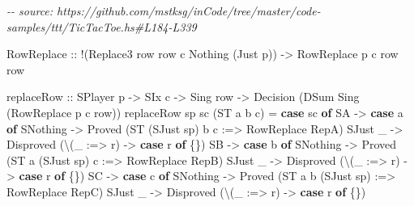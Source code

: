 \documentclass[]{article}
\newenvironment{Shaded}{}{}
\newcommand{\CommentTok}[1]{\textcolor[rgb]{0.38,0.63,0.69}{\textit{#1}}}
\newcommand{\DataTypeTok}[1]{\textcolor[rgb]{0.56,0.13,0.00}{#1}}
\newcommand{\KeywordTok}[1]{\textcolor[rgb]{0.00,0.44,0.13}{\textbf{#1}}}
\newcommand{\NormalTok}[1]{#1}
\newcommand{\OperatorTok}[1]{\textcolor[rgb]{0.40,0.40,0.40}{#1}}
\newcommand{\OtherTok}[1]{\textcolor[rgb]{0.00,0.44,0.13}{#1}}
\begin{document}
\begin{Shaded}
\begin{Highlighting}[]
\CommentTok{{-}{-} source: https://github.com/mstksg/inCode/tree/master/code{-}samples/ttt/TicTacToe.hs\#L184{-}L339}

    \DataTypeTok{RowReplace}
\OtherTok{        ::} \OperatorTok{!}\NormalTok{(}\DataTypeTok{Replace3}\NormalTok{ row row\textquotesingle{} c }\DataTypeTok{\textquotesingle{}Nothing}\NormalTok{ (}\DataTypeTok{\textquotesingle{}Just}\NormalTok{ p))}
        \OtherTok{{-}\textgreater{}} \DataTypeTok{RowReplace}\NormalTok{ p c row row\textquotesingle{}}

\NormalTok{replaceRow}
\OtherTok{    ::} \DataTypeTok{SPlayer}\NormalTok{ p}
    \OtherTok{{-}\textgreater{}} \DataTypeTok{SIx}\NormalTok{ c}
    \OtherTok{{-}\textgreater{}} \DataTypeTok{Sing}\NormalTok{ row}
    \OtherTok{{-}\textgreater{}} \DataTypeTok{Decision}\NormalTok{ (}\DataTypeTok{DSum} \DataTypeTok{Sing}\NormalTok{ (}\DataTypeTok{RowReplace}\NormalTok{ p c row))}
\NormalTok{replaceRow sp sc (}\DataTypeTok{ST}\NormalTok{ a b c) }\OtherTok{=}
    \KeywordTok{case}\NormalTok{ sc }\KeywordTok{of}
        \DataTypeTok{SA} \OtherTok{{-}\textgreater{}} \KeywordTok{case}\NormalTok{ a }\KeywordTok{of}
            \DataTypeTok{SNothing} \OtherTok{{-}\textgreater{}} \DataTypeTok{Proved}\NormalTok{ (}\DataTypeTok{ST}\NormalTok{ (}\DataTypeTok{SJust}\NormalTok{ sp) b c }\OperatorTok{:=\textgreater{}} \DataTypeTok{RowReplace} \DataTypeTok{RepA}\NormalTok{)}
            \DataTypeTok{SJust}\NormalTok{ \_ }\OtherTok{{-}\textgreater{}} \DataTypeTok{Disproved}\NormalTok{ (\textbackslash{}(\_ }\OperatorTok{:=\textgreater{}}\NormalTok{ r) }\OtherTok{{-}\textgreater{}} \KeywordTok{case}\NormalTok{ r }\KeywordTok{of}\NormalTok{ \{\})}
        \DataTypeTok{SB} \OtherTok{{-}\textgreater{}} \KeywordTok{case}\NormalTok{ b }\KeywordTok{of}
            \DataTypeTok{SNothing} \OtherTok{{-}\textgreater{}} \DataTypeTok{Proved}\NormalTok{ (}\DataTypeTok{ST}\NormalTok{ a (}\DataTypeTok{SJust}\NormalTok{ sp) c }\OperatorTok{:=\textgreater{}} \DataTypeTok{RowReplace} \DataTypeTok{RepB}\NormalTok{)}
            \DataTypeTok{SJust}\NormalTok{ \_ }\OtherTok{{-}\textgreater{}} \DataTypeTok{Disproved}\NormalTok{ (\textbackslash{}(\_ }\OperatorTok{:=\textgreater{}}\NormalTok{ r) }\OtherTok{{-}\textgreater{}} \KeywordTok{case}\NormalTok{ r }\KeywordTok{of}\NormalTok{ \{\})}
        \DataTypeTok{SC} \OtherTok{{-}\textgreater{}} \KeywordTok{case}\NormalTok{ c }\KeywordTok{of}
            \DataTypeTok{SNothing} \OtherTok{{-}\textgreater{}} \DataTypeTok{Proved}\NormalTok{ (}\DataTypeTok{ST}\NormalTok{ a b (}\DataTypeTok{SJust}\NormalTok{ sp) }\OperatorTok{:=\textgreater{}} \DataTypeTok{RowReplace} \DataTypeTok{RepC}\NormalTok{)}
            \DataTypeTok{SJust}\NormalTok{ \_ }\OtherTok{{-}\textgreater{}} \DataTypeTok{Disproved}\NormalTok{ (\textbackslash{}(\_ }\OperatorTok{:=\textgreater{}}\NormalTok{ r) }\OtherTok{{-}\textgreater{}} \KeywordTok{case}\NormalTok{ r }\KeywordTok{of}\NormalTok{ \{\})}
\end{Highlighting}
\end{Shaded}
\end{document}
